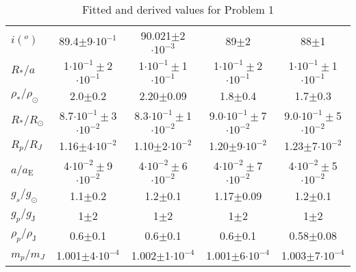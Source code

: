 \documentclass[10pt, preprint]{aastex}
\newcommand{\sol}{\ensuremath{\odot}}
\begin{document}
\begin{table}
\begin{tabular}{lcccc}
$i (^o)$ & 89.4$\pm$9$\cdot10^{-1}$&
90.021$\pm$2$\cdot10^{-3}$&
89$\pm$2&
88$\pm$1\\

$R_*/a$ & 1$\cdot10^{-1}\pm$2$\cdot10^{-1}$&
1$\cdot10^{-1}\pm$1$\cdot10^{-1}$&
1$\cdot10^{-1}\pm$2$\cdot10^{-1}$&
1$\cdot10^{-1}\pm$1$\cdot10^{-1}$ \\

$\rho_*/\rho_\sol$ & 2.0$\pm$0.2 &
 2.20$\pm$0.09&
 1.8$\pm$0.4&
 1.7$\pm$0.3 \\

$R_*/R_\sol$ & 8.7$\cdot10^{-1}\pm$3$\cdot10^{-2}$ &
8.3$\cdot10^{-1}\pm$1$\cdot10^{-2}$&
9.0$\cdot10^{-1}\pm$7$\cdot10^{-2}$&
9.0$\cdot10^{-1}\pm$5$\cdot10^{-2}$ \\

$R_p/R_J$ & 1.16$\pm$4$\cdot10^{-2}$&
1.10$\pm$2$\cdot10^{-2}$&
1.20$\pm$9$\cdot10^{-2}$&
1.23$\pm$7$\cdot10^{-2}$ \\

$a/a_\text{E}$ & 4$\cdot10^{-2}\pm$9$\cdot10^{-2}$&
4$\cdot10^{-2}\pm$6$\cdot10^{-2}$&
4$\cdot10^{-2}\pm$7$\cdot10^{-2}$&
4$\cdot10^{-2}\pm$5$\cdot10^{-2}$ \\

$g_s/g_\sol$ & 1.1$\pm$0.2 &
1.2$\pm$0.1 & 1.17$\pm$0.09 & 1.2$\pm$0.1 \\

$g_p/g_\text{J}$ & 1$\pm$2&
1$\pm$2 & 1$\pm$2 & 1$\pm$2 \\

$\rho_p/\rho_\text{J}$ & 0.6$\pm$0.1&
0.6$\pm$0.1&
0.6$\pm$0.1&
0.58$\pm$0.08\\

$m_p/m_J$ & 1.001$\pm$4$\cdot10^{-4}$&
1.002$\pm$1$\cdot10^{-4}$&
1.001$\pm$6$\cdot10^{-4}$&
1.003$\pm$7$\cdot10^{-4}$ \\

  \end{tabular}
  \caption{Fitted and derived values for Problem 1 \label{prob1}}
\end{table}
 
\end{document}
